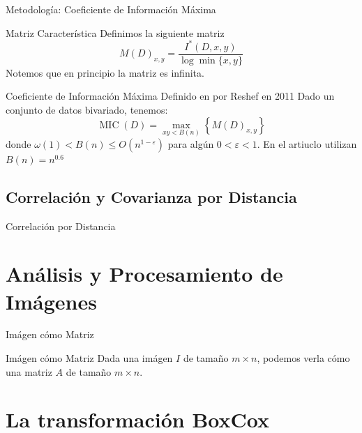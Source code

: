 \documentclass{beamer}
\begin{document}
\begin{frame}{Metodología: Coeficiente de Información Máxima}
    \begin{block}{Matriz Característica}
        Definimos la siguiente matriz       
        \begin{equation}
	    	M(D)_{x, y}=\frac{I^{*}(D, x, y)}{\log \min \{x, y\}}
        \end{equation}
        Notemos que en principio la matriz es infinita.
    \end{block}
    \pause

    \begin{block}{Coeficiente de Información Máxima}
        Definido en por Reshef en 2011 \cite{reshef2011} Dado un conjunto de datos bivariado, tenemos:
        \begin{equation}\label{MIC}
	    	\operatorname{MIC}(D)=\max _{x y<B(n)}\left\{M(D)_{x, y}\right\}
        \end{equation}
        donde $\omega(1)<B(n) \leq O\left(n^{1-\varepsilon}\right)$ para alg\'un $0<\varepsilon<1$. En el artiuclo utilizan $B(n)=n^{0.6}$
    \end{block}
\end{frame}

\subsection{Correlaci\'on y Covarianza por Distancia}

\begin{frame}{Correlaci\'on por Distancia}
\end{frame}

\section{Análisis y Procesamiento de Imágenes}
\begin{frame}{Imágen cómo Matriz}
    \pause
    \begin{block}{Imágen cómo Matriz}
        Dada una imágen $I$ de tamaño $m\times n$, podemos verla cómo una matriz $A$ de tamaño $m\times n$.
    \end{block}
\end{frame}

\section{La transformación BoxCox}
\end{document}
